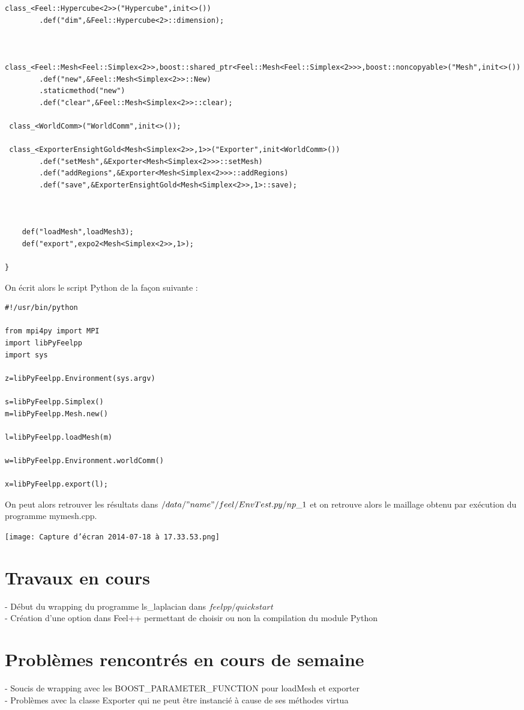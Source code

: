 \documentclass[12pt]{article}
\begin{document}
\begin{lstlisting}
class_<Feel::Hypercube<2>>("Hypercube",init<>())
        .def("dim",&Feel::Hypercube<2>::dimension);
        


class_<Feel::Mesh<Feel::Simplex<2>>,boost::shared_ptr<Feel::Mesh<Feel::Simplex<2>>>,boost::noncopyable>("Mesh",init<>())
        .def("new",&Feel::Mesh<Simplex<2>>::New)
        .staticmethod("new")
        .def("clear",&Feel::Mesh<Simplex<2>>::clear);
  
 class_<WorldComm>("WorldComm",init<>());

 class_<ExporterEnsightGold<Mesh<Simplex<2>>,1>>("Exporter",init<WorldComm>())
        .def("setMesh",&Exporter<Mesh<Simplex<2>>>::setMesh) 
        .def("addRegions",&Exporter<Mesh<Simplex<2>>>::addRegions)
        .def("save",&ExporterEnsightGold<Mesh<Simplex<2>>,1>::save);
      
        
    
    def("loadMesh",loadMesh3);
    def("export",expo2<Mesh<Simplex<2>>,1>);
    
}
\end{lstlisting}

On écrit alors le script Python de la façon suivante :

\begin{lstlisting}
#!/usr/bin/python

from mpi4py import MPI
import libPyFeelpp
import sys

z=libPyFeelpp.Environment(sys.argv)

s=libPyFeelpp.Simplex()
m=libPyFeelpp.Mesh.new()

l=libPyFeelpp.loadMesh(m)

w=libPyFeelpp.Environment.worldComm()

x=libPyFeelpp.export(l);

\end{lstlisting}

On peut alors retrouver les résultats dans $/data/"name"/feel/EnvTest.py/np\_1$ et on retrouve alors le maillage obtenu par exécution du programme mymesh.cpp.

\texttt{[image: Capture d’écran 2014-07-18 à 17.33.53.png]} 

\section{Travaux en cours}
- Début du wrapping du programme ls\_laplacian dans $feelpp/quickstart$\\

- Création d'une option dans Feel++ permettant de choisir ou non la compilation du module Python

\section{Problèmes rencontrés en cours de semaine}
- Soucis de wrapping avec les BOOST\_PARAMETER\_FUNCTION pour loadMesh et exporter \\

- Problèmes avec la classe Exporter qui ne peut être instancié à cause de ses méthodes virtua
\end{document}
